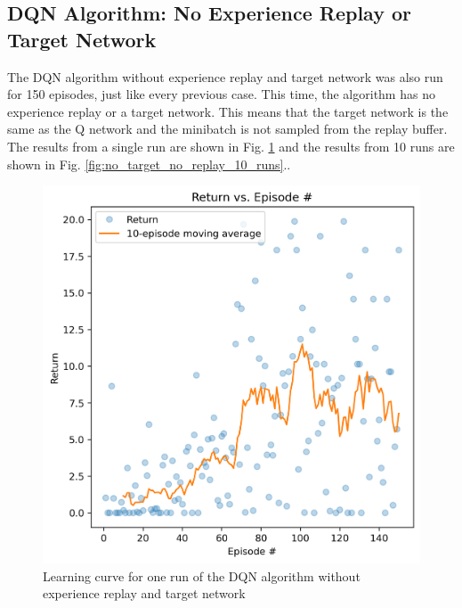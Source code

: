 \documentclass[conference]{IEEEtran}
\begin{document}
\subsection{DQN Algorithm: No Experience Replay or Target Network}
The DQN algorithm without experience replay and target network was also run for 150 episodes, just like every previous case. This time, the algorithm has no experience replay or a target network. This means that the target network is the same as the Q network and the minibatch is not sampled from the replay buffer. The results from a single run are shown in Fig. \ref{fig:no_target_no_replay_one_run} and the results from 10 runs are shown in Fig. \ref{fig:no_target_no_replay_10_runs}..

\begin{figure}[h]
\centering
\includegraphics[width=0.94\linewidth]{../figures/no_target_no_replay/return_150_1.png}
\caption{Learning curve for one run of the DQN algorithm without experience replay and target network}
\label{fig:no_target_no_replay_one_run}
\end{figure}
\end{document}

